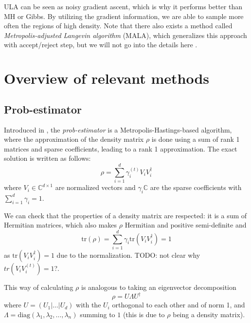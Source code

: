 \documentclass[12pt]{memoir}
\newcommand{\tr}{\text{tr}}
\begin{document}
ULA can be seen as noisy gradient ascent, which is why it performs better than MH or Gibbs. By utilizing the gradient information, we are able to sample more often the regions of high density. Note that there also exists a method called \textit{Metropolis-adjusted Langevin algorithm} (MALA), which generalizes this approach with accept/reject step, but we will not go into the details here \cite{mcmc:langenvin-blog:Ansari2024Apr, wiki:MALA}. 

\chapter{Overview of relevant methods} \label{section:relevant-methods}

\section{Prob-estimator}
Introduced in \cite{MA17}, the \textit{prob-estimator} is a Metropolis-Hastings-based algorithm, where the approximation of the density matrix $\rho$ is done using a sum of rank 1 matrices and sparse coefficients, leading to a rank 1 approximation. The exact solution is written as follows:
\begin{equation}\label{eq:rank1-approx}
    \rho = \sum_{i=1}^d \gamma_i^{(t)} V_i V_i^\dagger
\end{equation}
where $V_i \in \mathbb{C}^{d\times 1}$ are normalized vectors and $\gamma_i \mathbb{C}$ are the sparse coefficients with $\sum_{i=1}^d \gamma_i = 1$.\medbreak

We can check that the properties of a density matrix are respected: it is a sum of Hermitian matrices, which also makes $\rho$ Hermitian and positive semi-definite and 
\begin{equation}
    \tr(\rho) = \sum_{i=1}^{d} \gamma_i \tr(V_i V_i^\dagger) = 1
\end{equation}
as $\tr(V_i V_i^\dagger) = 1$ due to the normalization.
TODO: not clear why $tr(V_i V_i^{(t)}) = 1$?.

This way of calculating $\rho$ is analogous to taking an eigenvector decomposition
\begin{equation}
    \rho = U\Lambda U^\dagger
\end{equation}
where $U = (U_1|\dots|U_d)$ with the $U_i$ orthogonal to each other and of norm 1, and $\Lambda = \text{diag}(\lambda_1, \lambda_2, \dots, \lambda_n)$ summing to $1$ (this is due to $\rho$ being a density matrix).\medbreak
\end{document}
